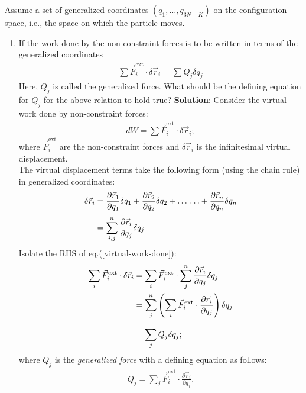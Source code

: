 Assume a set of generalized coordinates $\displaystyle(q_1, \ldots, q_{3N-K})$ on the configuration space, i.e., the space on which the particle moves.
\bigskip
    \hline\hline
\begin{enumerate}
    \item If the work done by the non-constraint forces is to be written in terms of the generalized coordinates
    \begin{align*}
        \sum\vec{F}_i^{\text{ext}} \cdot \delta \vec{r}_i = \sum Q_j \delta q_j\label{d-alembert-principle}
    \end{align*}
    Here, $Q_j$ is called the generalized force. What should be the defining equation for $Q_j$ for the above relation to hold true?\bigskip
    \hline\hline\bigskip
    \textbf{Solution}: Consider the virtual work done by non-constraint forces:
    \begin{align}
        dW=\sum\vec{F}_i^{\text{ext}}\cdot\delta \vec{r}_i;\label{virtual-work-done}
    \end{align}
    where $\vec{F}_i^{\text{ext}}$ are the non-constraint forces and $\delta\vec{r}_i$ is the infinitesimal virtual displacement.\\
    The virtual displacement terms take the following form (using the chain rule) in generalized coordinates:
    \begin{align}
        \delta\vec{r}_i&=\frac{\partial \vec{r}_1}{\partial q_1}\delta q_1+\frac{\partial \vec{r}_2}{\partial q_2}\delta q_2+\ldots\,\ldots+\frac{\partial \vec{r}_n}{\partial q_n}\delta q_n\notag\\[3pt]
        &=\sum_{i,j}^n \frac{\partial \vec{r}_i}{\partial q_j}\delta{q}_j\label{virtual-disp}
    \end{align}
    Isolate the RHS of eq.(\ref{virtual-work-done}):
    \begin{align}
        \sum_i\vec{F}_i^{\text{ext}}\cdot\delta\vec{r}_i&=\sum_i\vec{F}_i^{\text{ext}}\cdot\sum_j^n \frac{\partial \vec{r}_i}{\partial q_j}\delta{q}_j\notag\\
        &=\sum_j^n\left(\sum_i\vec{F}_i^{\text{ext}}\cdot\frac{\partial \vec{r}_i}{\partial q_j}\right)\delta q_j\notag\\[7pt]
        &=\sum_jQ_j\delta q_j\label{general-force};
    \end{align}
    where $Q_j$ is the \textit{generalized force} with a defining equation as follows:
    \begin{align*}
    Q_j = \sum_j\vec{F}_i^{\text{ext}}\cdot \frac{\partial \vec{r}_i}{\partial q_j}.

\end{align*}
\end{enumerate}
